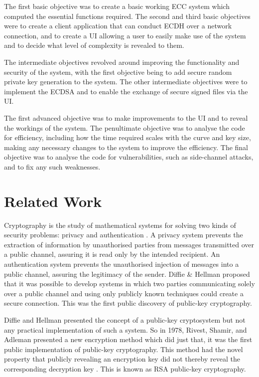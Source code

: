 \documentclass[12pt,a4paper]{article}
\begin{document}
The first basic objective was to create a basic working ECC system which computed the essential functions required. 
The second and third basic objectives were to create a client application that can conduct ECDH over a network connection, 
and to create a UI allowing a user to easily make use of the system and to decide what level of complexity is revealed to them. 

The intermediate objectives revolved around improving the functionality and security of the system, 
with the first objective being to add secure random private key generation to the system. 
The other intermediate objectives were to implement the ECDSA and to enable the exchange of secure signed files via the UI. 

The first advanced objective was to make improvements to the UI and to reveal the workings of the system. 
The penultimate objective was to analyse the code for efficiency, including how the time required scales with the curve and key size, 
making any necessary changes to the system to improve the efficiency. 
The final objective was to analyse the code for vulnerabilities, such as side-channel attacks, and to fix any such weaknesses. 


\section{Related Work}\noindent
Cryptography is the study of mathematical systems for solving two kinds of security problems: privacy and authentication \cite{1055638}. 
A privacy system prevents the extraction of information by unauthorised parties from messages transmitted over a public channel, assuring it is read only by the intended recipient. 
An authentication system prevents the unauthorised injection of messages into a public channel, assuring the legitimacy of the sender. 
Diffie \& Hellman \citeyear{1055638} proposed that it was possible to develop systems in which two parties communicating solely over a public channel and using only publicly known techniques could create a secure connection. 
This was the first public discovery of public-key cryptography.

Diffie and Hellman presented the concept of a public-key cryptosystem but not any practical implementation of such a system. 
So in 1978, Rivest, Shamir, and Adleman presented a new encryption method which did just that, it was the first public implementation of public-key cryptography. 
This method had the novel property that publicly revealing an encryption key did not thereby reveal the corresponding decryption key \cite{10.1145/359340.359342}. 
This is known as RSA public-key cryptography. 
\end{document}
